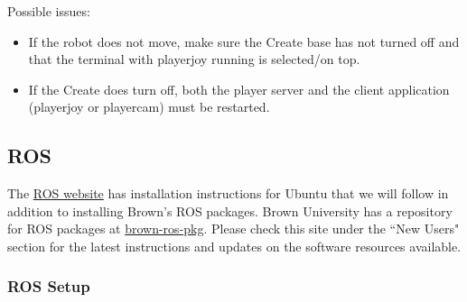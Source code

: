 \begin{enumerate}
Possible issues:
\begin{itemize}
\item If the robot does not move, make sure the Create base has not turned off and that the terminal with playerjoy running is selected/on top.
\item If the Create does turn off, both the player server and the client application (playerjoy or playercam) must be restarted.
\end{itemize}

\end{enumerate}


\subsection{ROS}
\label{sec:ros}

The \href{http://www.ros.org/wiki/ROS/Installation/Ubuntu/Deb}{ROS website} has installation instructions for Ubuntu that we will follow in addition to installing Brown's ROS packages. Brown University has a repository for ROS packages at \href{http://code.google.com/p/brown-ros-pkg/}{brown-ros-pkg}. Please check this site under the ``New Users" section for the latest instructions and updates on the software resources available.

\subsubsection{ROS Setup}

